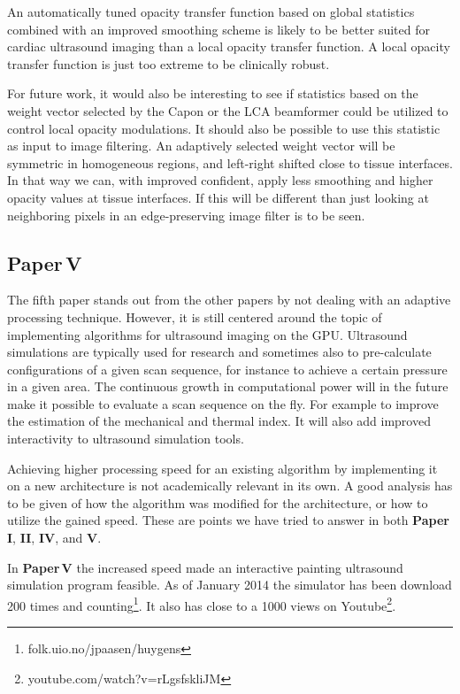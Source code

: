 An automatically tuned opacity transfer function based on global statistics combined with an improved smoothing scheme is likely to be better suited for cardiac ultrasound imaging than a local opacity transfer function. A local opacity transfer function is just too extreme to be clinically robust. 

For future work, it would also be interesting to see if statistics based on the weight vector selected by the Capon or the LCA beamformer could be utilized to control local opacity modulations. It should also be possible to use this statistic as input to image filtering. An adaptively selected weight vector will be symmetric in homogeneous regions, and left-right shifted close to tissue interfaces. In that way we can, with improved confident, apply less smoothing and higher opacity values at tissue interfaces. If this will be different than just looking at neighboring pixels in an edge-preserving image filter is to be seen.

\subsection{Paper\,V}
The fifth paper stands out from the other papers by not dealing with an adaptive processing technique. However, it is still centered around the topic of implementing algorithms for ultrasound imaging on the GPU. Ultrasound simulations are typically used for research and sometimes also to pre-calculate configurations of a given scan sequence, for instance to achieve a certain pressure in a given area. The continuous growth in computational power will in the future make it possible to evaluate a scan sequence on the fly. For example to improve the estimation of the mechanical and thermal index. It will also add improved interactivity to ultrasound simulation tools. 

Achieving higher processing speed for an existing algorithm by implementing it on a new architecture is not academically relevant in its own. A good analysis has to be given of how the algorithm was modified for the architecture, or how to utilize the gained speed. These are points we have tried to answer in both \textbf{Paper\,I}, \textbf{II},  \textbf{IV}, and \textbf{V}.  

In \textbf{Paper\,V} the increased speed made an interactive painting ultrasound simulation program feasible. As of January 2014 the simulator has been download 200 times and counting\footnote{folk.uio.no/jpaasen/huygens}. It also has close to a 1000 views on Youtube\footnote{youtube.com/watch?v=rLgsfskliJM}.

